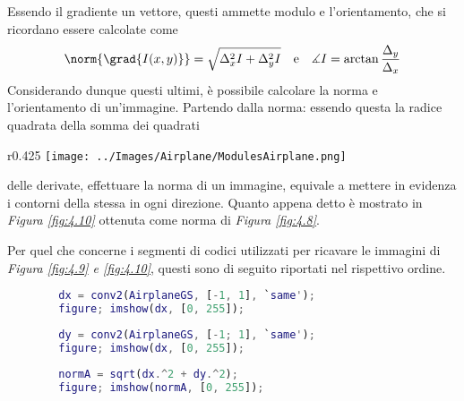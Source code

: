 \documentclass{subfiles}
\begin{document}
Essendo il gradiente un vettore, questi ammette modulo e l'orientamento, che si ricordano essere calcolate come
\[
    \norm{\grad{I(x,y)}} = \sqrt{\Delta_{x}^{2}I + \Delta_{y}^{2}I} \quad \text{e} \quad \measuredangle I = \arctan \frac{\Delta_{y}}{\Delta_{x}}
\]
Considerando dunque questi ultimi, è possibile calcolare la norma e l'orientamento di un'immagine.
Partendo dalla norma: essendo questa la radice quadrata della somma dei quadrati
\begin{wrapfigure}[10]{r}{0.425\textwidth}
    \centering
    \texttt{[image: ../Images/Airplane/ModulesAirplane.png]}
    \caption{Contorni  omnidirezionali di \emph{Figura \ref{fig:4.9}}}
    \label{fig:4.10}
\end{wrapfigure}
delle derivate, effettuare la norma di un immagine, equivale a mettere in evidenza i contorni della stessa in ogni direzione.
Quanto appena detto è mostrato in \emph{Figura \ref{fig:4.10}} ottenuta come norma di \emph{Figura \ref{fig:4.8}}.

Per quel che concerne i segmenti di codici utilizzati per ricavare le immagini di \emph{Figura \ref{fig:4.9} \emph{e} \ref{fig:4.10}},
questi sono di seguito riportati nel rispettivo ordine.
\begin{center}
    \begin{lstlisting}[language = MATLAB]
        % caricamento di AirplaneGS.png
        dx = conv2(AirplaneGS, [-1, 1], `same');
        figure; imshow(dx, [0, 255]);
    \end{lstlisting}
    \begin{lstlisting}[language = MATLAB]
        % caricamento di AirplaneGS.png
        dy = conv2(AirplaneGS, [-1; 1], `same');
        figure; imshow(dx, [0, 255]);
    \end{lstlisting}
    \begin{lstlisting}[language = MATLAB]
        % dx e dy sono le immagine sin ora calcolate
        normA = sqrt(dx.^2 + dy.^2);
        figure; imshow(normA, [0, 255]);
    \end{lstlisting}
\end{center}
\end{document}
